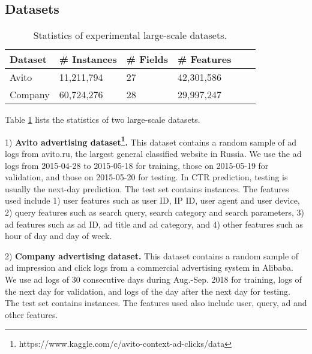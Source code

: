 \documentclass{article}
\begin{document}
\subsection{Datasets}
\begin{table}[!t]
\renewcommand{\arraystretch}{1.2}
\centering
\begin{tabular}{|l|l|l|l|l|l|}
\hline
\textbf{Dataset} & \textbf{\# Instances} & \textbf{\# Fields} & \textbf{\# Features} \\
\hline
Avito & 11,211,794 & 27 & 42,301,586 \\
\hline
Company & 60,724,276 & 28 & 29,997,247 \\
\hline
\end{tabular}
\vskip -4pt
\caption{Statistics of experimental large-scale datasets.}
\label{tab_stat}
\end{table}

Table \ref{tab_stat} lists the statistics of two large-scale datasets.

1) \textbf{Avito advertising dataset\footnote{https://www.kaggle.com/c/avito-context-ad-clicks/data}.}
This dataset contains a random sample of ad logs from avito.ru, the largest general classified website in Russia.
We use the ad logs from 2015-04-28 to 2015-05-18 for training, those on 2015-05-19 for validation, and those on 2015-05-20 for testing. In CTR prediction, testing is usually the next-day prediction. The test set contains  instances.
The features used include 1) user features such as user ID, IP ID, user agent and user device, 2) query features such as search query, search category and search parameters, 3) ad features such as ad ID, ad title and ad category, and 4) other features such as hour of day and day of week.

2) \textbf{Company advertising dataset.}
This dataset contains a random sample of ad impression and click logs from a commercial advertising system in Alibaba. We use ad logs of 30 consecutive days during Aug.-Sep. 2018 for training, logs of the next day for validation, and logs of the day after the next day for testing.  The test set contains  instances.
The features used also include user, query, ad and other features.
\end{document}
